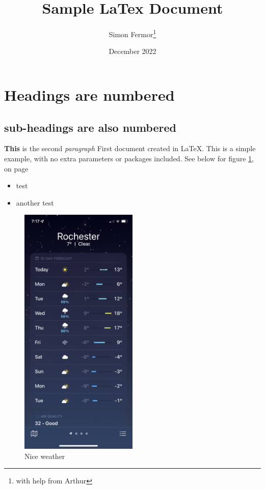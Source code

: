 \documentclass[12pt, letterpaper]{article}
\title{Sample LaTex Document}
\author{Simon Fermor\thanks{with help from Arthur}}
\date{December 2022}
\begin{document}
\maketitle
\tableofcontents

\section{Headings are numbered}
\subsection{sub-headings are also numbered}
\textbf{This} is the second \textit{paragraph}
First document created in \LaTeX. This is a simple example, with no extra parameters or packages included.
See below for figure \ref{fig:rochester}, on page \pageref{fig:rochester}
\begin{itemize}
\item test
\item another test
\end{itemize}
\begin{figure}[ht]
\centering
\includegraphics[width=0.5\textwidth]{20221107_011741000_iOS.png}
\caption{Nice weather}
\label{fig:rochester}
\end{figure}
\end{document}
